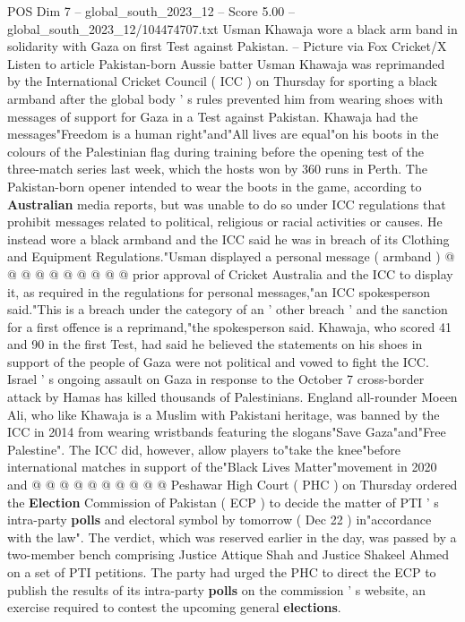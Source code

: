 \begin{textsample}{POS Dim 7 – global\_south\_2023\_12 – Score 5.00 – global\_south\_2023\_12/104474707.txt}  \label{ex:f7_pos_262}
Usman Khawaja wore a black arm band in solidarity with Gaza on first Test against Pakistan. -- Picture via Fox Cricket/X Listen to article Pakistan-born Aussie batter Usman Khawaja was reprimanded by the International Cricket Council ( ICC ) on Thursday for sporting a black armband after the global body ' s rules prevented him from wearing shoes with messages of support for Gaza in a Test against Pakistan.
Khawaja had the messages"Freedom is a human right"and"All lives are equal"on his boots in the colours of the Palestinian flag during training before the opening test of the three-match series last week, which the hosts won by 360 runs in Perth.
The Pakistan-born opener intended to wear the boots in the game, according to \textbf{Australian} media reports, but was unable to do so under ICC regulations that prohibit messages related to political, religious or racial activities or causes.
He instead wore a black armband and the ICC said he was in breach of its Clothing and Equipment Regulations."Usman displayed a personal message ( armband ) @ @ @ @ @ @ @ @ @ @ prior approval of Cricket Australia and the ICC to display it, as required in the regulations for personal messages,"an ICC spokesperson said."This is a breach under the category of an ' other breach ' and the sanction for a first offence is a reprimand,"the spokesperson said.
Khawaja, who scored 41 and 90 in the first Test, had said he believed the statements on his shoes in support of the people of Gaza were not political and vowed to fight the ICC.
Israel ' s ongoing assault on Gaza in response to the October 7 cross-border attack by Hamas has killed thousands of Palestinians.
England all-rounder Moeen Ali, who like Khawaja is a Muslim with Pakistani heritage, was banned by the ICC in 2014 from wearing wristbands featuring the slogans"Save Gaza"and"Free Palestine".
The ICC did, however, allow players to"take the knee"before international matches in support of the"Black Lives Matter"movement in 2020 and @ @ @ @ @ @ @ @ @ @ Peshawar High Court ( PHC ) on Thursday ordered the \textbf{Election} Commission of Pakistan ( ECP ) to decide the matter of PTI ' s intra-party \textbf{polls} and electoral symbol by tomorrow ( Dec 22 ) in"accordance with the law".
The verdict, which was reserved earlier in the day, was passed by a two-member bench comprising Justice Attique Shah and Justice Shakeel Ahmed on a set of PTI petitions.
The party had urged the PHC to direct the ECP to publish the results of its intra-party \textbf{polls} on the commission ' s website, an exercise required to contest the upcoming general \textbf{elections}.

\end{textsample}
